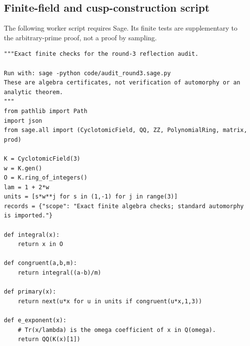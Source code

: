 \documentclass[12pt]{article}
\begin{document}
\subsection{Finite-field and cusp-construction script}
The following worker script requires Sage.  Its finite tests are
supplementary to the arbitrary-prime proof, not a proof by sampling.
\begin{verbatim}
"""Exact finite checks for the round-3 reflection audit.

Run with: sage -python code/audit_round3.sage.py
These are algebra certificates, not verification of automorphy or an analytic theorem.
"""
from pathlib import Path
import json
from sage.all import (CyclotomicField, QQ, ZZ, PolynomialRing, matrix, prod)

K = CyclotomicField(3)
w = K.gen()
O = K.ring_of_integers()
lam = 1 + 2*w
units = [s*w**j for s in (1,-1) for j in range(3)]
records = {"scope": "Exact finite algebra checks; standard automorphy is imported."}

def integral(x):
    return x in O

def congruent(a,b,m):
    return integral((a-b)/m)

def primary(x):
    return next(u*x for u in units if congruent(u*x,1,3))

def e_exponent(x):
    # Tr(x/lambda) is the omega coefficient of x in Q(omega).
    return QQ(K(x)[1])


\end{verbatim}
\end{document}
